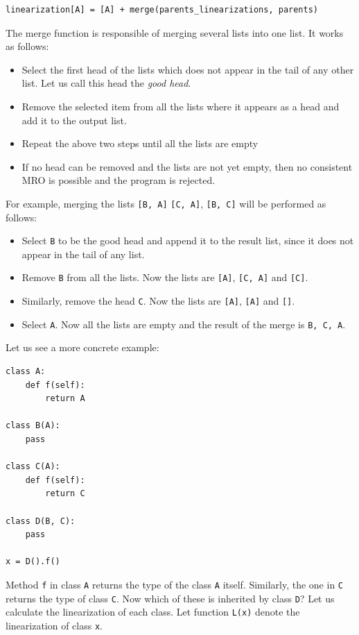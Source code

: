 \begin{lstlisting}
linearization[A] = [A] + merge(parents_linearizations, parents)
\end{lstlisting}
The merge function is responsible of merging several lists into one list. It works as follows:
\begin{itemize}
	\item Select the first head of the lists which does not appear in the tail of any other list. Let us call this head the \textit{good head}.
	\item Remove the selected item from all the lists where it appears as a head and add it to the output list.
	\item Repeat the above two steps until all the lists are empty
	\item If no head can be removed and the lists are not yet empty, then no consistent MRO is possible and the program is rejected.
\end{itemize}
For example, merging the lists \lstinline|[B, A]| \lstinline|[C, A]|, \lstinline|[B, C]| will be performed as follows:
\begin{itemize}
	\item Select \lstinline|B| to be the good head and append it to the result list, since it does not appear in the tail of any list.
	\item Remove \lstinline|B| from all the lists. Now the lists are \lstinline|[A]|, \lstinline|[C, A]| and \lstinline|[C]|.
	\item Similarly, remove the head \lstinline|C|. Now the lists are \lstinline|[A]|, \lstinline|[A]| and \lstinline|[]|.
	\item Select \lstinline|A|. Now all the lists are empty and the result of the merge is \lstinline|B, C, A|.
\end{itemize}
Let us see a more concrete example:
\begin{lstlisting}
class A:
	def f(self):
		return A

class B(A):
	pass

class C(A):
	def f(self):
		return C
		
class D(B, C):
	pass
	
x = D().f()
\end{lstlisting}
Method \lstinline|f| in class \lstinline|A| returns the type of the class \lstinline|A| itself. Similarly, the one in \lstinline|C| returns the type of class \lstinline|C|. Now which of these is inherited by class \lstinline|D|? Let us calculate the linearization of each class.
Let function \lstinline|L(x)| denote the linearization of class \lstinline|x|.
